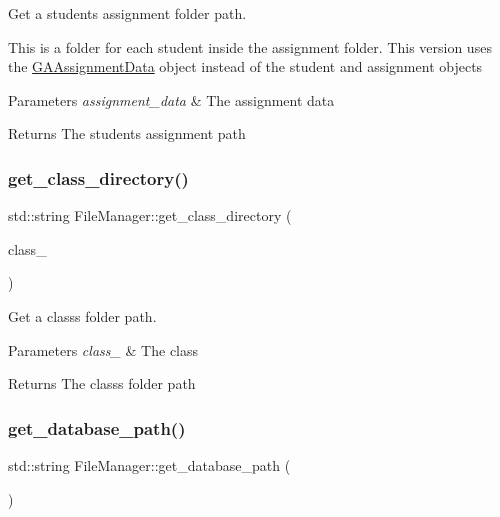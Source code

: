 Get a student\textquotesingle{}s assignment folder path. 

This is a folder for each student inside the assignment folder. This version uses the \hyperlink{class_g_a_assignment_data}{G\+A\+Assignment\+Data} object instead of the student and assignment objects


\begin{DoxyParams}{Parameters}
{\em assignment\+\_\+data} & The assignment data \\
\hline
\end{DoxyParams}
\begin{DoxyReturn}{Returns}
The studen\textquotesingle{}ts assignment path 
\end{DoxyReturn}
\mbox{\label{class_file_manager_a6906ae61830e4ae2f9ebd06ece9beeb4}} 
\subsubsection{\texorpdfstring{get\+\_\+class\+\_\+directory()}{get\_class\_directory()}}
{\footnotesize\ttfamily std\+::string File\+Manager\+::get\+\_\+class\+\_\+directory (\begin{DoxyParamCaption}\item[{\hyperlink{class_g_a_class}{G\+A\+Class} $\ast$}]{class\+\_\+ }\end{DoxyParamCaption})\hspace{0.3cm}{\ttfamily [static]}}



Get a class\textquotesingle{}s folder path. 


\begin{DoxyParams}{Parameters}
{\em class\+\_\+} & The class \\
\hline
\end{DoxyParams}
\begin{DoxyReturn}{Returns}
The class\textquotesingle{}s folder path 
\end{DoxyReturn}
\mbox{\label{class_file_manager_a4c028190b9434dc2bd3b467af1e3b2ed}} 
\subsubsection{\texorpdfstring{get\+\_\+database\+\_\+path()}{get\_database\_path()}}
{\footnotesize\ttfamily std\+::string File\+Manager\+::get\+\_\+database\+\_\+path (\begin{DoxyParamCaption}{ }\end{DoxyParamCaption})\hspace{0.3cm}{\ttfamily [static]}}



